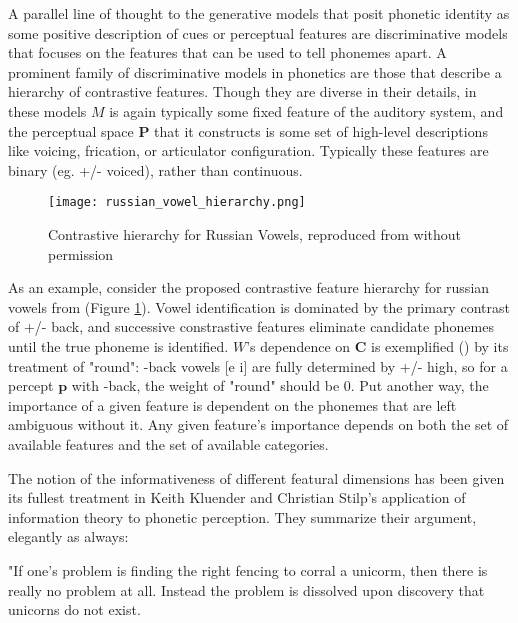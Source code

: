 \begin{multicols}{2}
A parallel line of thought to the generative models that posit phonetic identity as some positive description of cues or perceptual features are discriminative models that focuses on the features that can be used to tell phonemes apart. A prominent family of discriminative models in phonetics are those that describe a hierarchy of contrastive features\cite{Dresher2008,clementsFeatureOrganization2006,halleFeatureSpreadingRepresentation2000}. Though they are diverse in their details, in these models $M$ is again typically some fixed feature of the auditory system, and the perceptual space $\mathbf{P}$ that it constructs is some set of high-level descriptions like voicing, frication, or articulator configuration. Typically these features are binary (eg. +/- voiced), rather than continuous.

\begin{figure}[H]
\texttt{[image: russian\_vowel\_hierarchy.png]}
\caption{Contrastive hierarchy for Russian Vowels, reproduced from \cite{iosadVowelReductionRussian2012} without permission}
\label{fig:hierarchy}
\end{figure}

As an example, consider the proposed contrastive feature hierarchy for russian vowels from \cite{iosadVowelReductionRussian2012} (Figure \ref{fig:hierarchy}). Vowel identification is dominated by the primary contrast of +/- back, and successive constrastive features eliminate candidate phonemes until the true phoneme is identified. $W$'s dependence on $\mathbf{C}$ is exemplified () by its treatment of "round": -back vowels [e i] are fully determined by +/- high, so for a percept $\mathbf{p}$ with -back, the weight of "round" should be 0. Put another way, the importance of a given feature is dependent on the phonemes that are left ambiguous without it. Any given feature's importance depends on both the set of available features and the set of available categories. 

The notion of the informativeness of different featural dimensions has been given its fullest treatment in Keith Kluender and Christian Stilp's application of information theory to phonetic perception\cite{kluenderLongstandingProblemsSpeech2019a,kluenderPerceptionVowelSounds2013,stilpEfficientCodingStatistically2012,stilpRapidEfficientCoding2010}. They summarize their argument, elegantly as always:

\begin{leftbar}
"If one's problem is finding the right fencing to corral a unicorm, then there is really no problem at all. Instead the problem is dissolved upon discovery that unicorns do not exist.


\end{leftbar}
\end{multicols}
